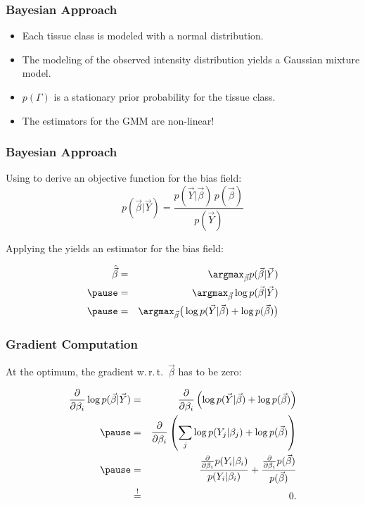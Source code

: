 \begin{frame}
  \frametitle{Bayesian Approach \cont}
  

  \begin{itemize}
    \item Each tissue class is modeled with a normal distribution. \\[.25cm] \pause
    \item The modeling of the observed intensity distribution yields a Gaussian mixture model. \\[.25cm] \pause
    \item $p(\Gamma)$ is a stationary prior probability for the tissue class. \\[.25cm] \pause
    \item The estimators for the GMM are non-linear!
  \end{itemize}
\end{frame}


\begin{frame}
  \frametitle{Bayesian Approach \cont}

  Using  to derive an objective function for the bias field:
  \begin{displaymath}
    p(\vec \beta | \vec Y) = \frac{p(\vec Y | \vec \beta) \, p(\vec \beta)} {p(\vec Y)}
  \end{displaymath}
  \pspread

  Applying the  yields an estimator for the bias field:

  \begin{eqnarray*}
    \hat{\vec \beta} &=& \argmax_{\vec \beta} p(\vec \beta | \vec Y) \\ \pause 
                     &=& \argmax_{\vec \beta} \log p(\vec \beta | \vec Y) \\ \pause 
                     &=& \argmax_{\vec \beta} \big( \log p(\vec Y | \vec \beta) + \log p(\vec \beta) \big)
  \end{eqnarray*}
\end{frame}


\begin{frame}
  \frametitle{Gradient Computation}
  
  At the optimum, the gradient w.\,r.\,t.\ $\vec \beta$ has to be zero:

  \begin{eqnarray*}
    \frac{\partial}{\partial \beta_i} \log p(\vec \beta | \vec Y) 
    &=& \frac{\partial}{\partial \beta_i} \left( \log p(\vec Y | \vec \beta) + \log p(\vec \beta) \right) \\ \pause 
    &=& \frac{\partial}{\partial \beta_i} \left( \sum_j \log p(Y_j | \beta_j) + \log p(\vec \beta) \right) \\ \pause 
    &=& \frac{\frac{\partial}{\partial \beta_i} p(Y_i | \beta_i)}{p(Y_i | \beta_i)} + \frac{\frac{\partial}{\partial \beta_i} p(\vec \beta)}{p(\vec \beta)} \\
    &\stackrel{!}{=}& 0.
  \end{eqnarray*}
\end{frame}


